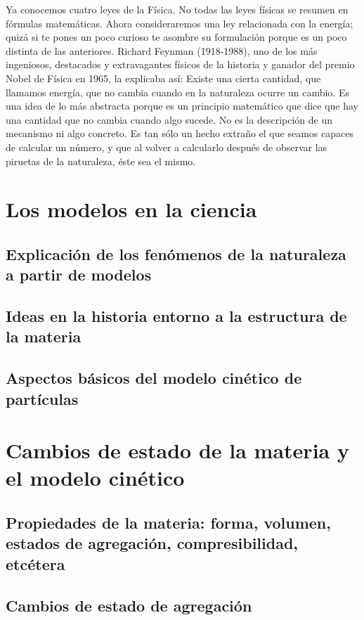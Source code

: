 \documentclass[11pt]{book}
\begin{document}
Ya conocemos cuatro leyes de la F\'isica. No todas las leyes f\'isicas
se resumen en f\'ormulas matem\'aticas. Ahora consideraremos una ley
relacionada con la energ\'ia; quiz\'a si te pones un poco curioso te
asombre su formulaci\'on porque es un poco distinta de las anteriores.
Richard Feynman (1918-1988), uno de los m\'as ingeniosos, destacados
y extravagantes f\'isicos de la historia y ganador del premio Nobel de
F\'isica en 1965, la explicaba as\'i:
Existe una cierta cantidad, que llamamos energ\'ia, que no cambia
cuando en la naturaleza ocurre un cambio. Es una idea de lo m\'as abstracta
porque es un principio matem\'atico que dice que hay una cantidad que no cambia
cuando algo sucede. No es la descripci\'on de un
mecanismo ni algo concreto. Es tan s\'olo un hecho extraño el que seamos capaces
de calcular un n\'umero, y que al volver a calcularlo despu\'es de observar las
piruetas de la naturaleza, \'este sea el mismo.
\newpage \thispagestyle{plain}
\section{ Los modelos en la ciencia}
\subsection{Explicaci\'on de los fen\'omenos de la naturaleza a partir de modelos}
\subsection{Ideas en la historia entorno a la estructura de la materia}
\subsection{Aspectos b\'asicos del modelo cin\'etico de part\'iculas}
\newpage \thispagestyle{plain}
\section{ Cambios de estado de la materia y el modelo cin\'etico}
\subsection{Propiedades de la materia: forma, volumen, estados de agregaci\'on, compresibilidad, etc\'etera}
\subsection{Cambios de estado de agregaci\'on}
\end{document}
